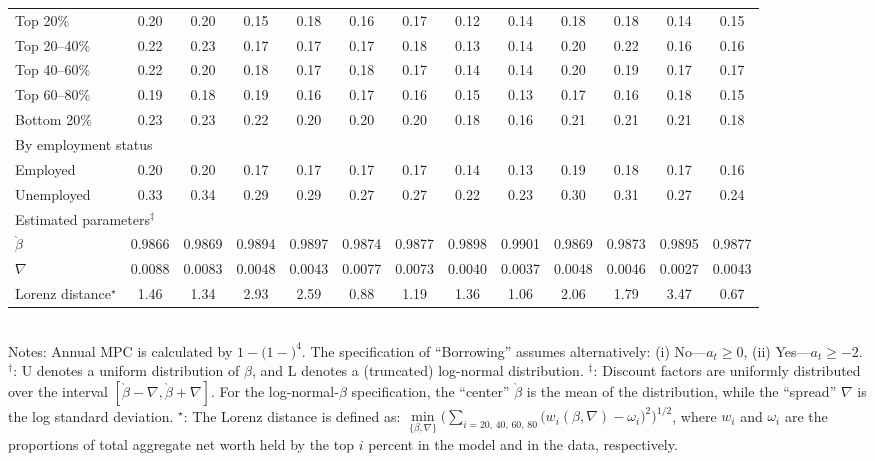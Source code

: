 \begin{sidewaystable}
\begin{tabular}{l c c c c c c c c c c c c}
Top 20\%    & 0.20 & 0.20 & 0.15 & 0.18 & 0.16 & 0.17 & 0.12 & 0.14 & 0.18 & 0.18 & 0.14 & 0.15\\
Top 20--40\% & 0.22 & 0.23 & 0.17 & 0.17 & 0.17 & 0.18 & 0.13 & 0.14 & 0.20 & 0.22 & 0.16 & 0.16\\
Top 40--60\% & 0.22 & 0.20 & 0.18 & 0.17 & 0.18 & 0.17 & 0.14 & 0.14 & 0.20 & 0.19 & 0.17 & 0.17\\
Top 60--80\% & 0.19 & 0.18 & 0.19 & 0.16 & 0.17 & 0.16 & 0.15 & 0.13 & 0.17 & 0.16 & 0.18 & 0.15\\
Bottom 20\% & 0.23 & 0.23 & 0.22 & 0.20 & 0.20 & 0.20 & 0.18 & 0.16 & 0.21 & 0.21 & 0.21 & 0.18\\
\multicolumn{13}{l}{By employment status }\\
Employed    & 0.20 & 0.20 & 0.17 & 0.17 & 0.17 & 0.17 & 0.14 & 0.13 & 0.19 & 0.18 & 0.17 & 0.16\\
Unemployed  & 0.33 & 0.34 & 0.29 & 0.29 & 0.27 & 0.27 & 0.22 & 0.23 & 0.30 & 0.31 & 0.27 & 0.24\\
\midrule
\multicolumn{13}{l}{Estimated parameters${}^\ddagger$ }\\
$\grave{\beta}$ & 0.9866 & 0.9869 & 0.9894 & 0.9897 & 0.9874 & 0.9877 & 0.9898 & 0.9901 & 0.9869 & 0.9873 & 0.9895 & 0.9877\\
$\nabla$ & 0.0088 & 0.0083 & 0.0048 & 0.0043 & 0.0077 & 0.0073 & 0.0040 & 0.0037 & 0.0048 & 0.0046 & 0.0027 & 0.0043\\
\midrule
Lorenz distance${}^\star$ & 1.46 & 1.34 & 2.93 & 2.59 & 0.88 & 1.19 & 1.36 & 1.06 & 2.06 & 1.79 & 3.47 & 0.67\\
\bottomrule
\end{tabular}\\
\footnotesize Notes: Annual MPC is calculated by $1-(1-$$)^{4}$.  The specification of ``Borrowing'' assumes alternatively: (i) No---$a_t\ge0$, (ii) Yes---$a_t\ge-2$. ${}^\dagger$: U denotes a uniform distribution of $\beta$, and L denotes a (truncated) log-normal distribution. ${}^\ddagger$: Discount factors are uniformly distributed over the interval $[\grave{\beta}-\nabla,\grave{\beta}+\nabla]$. For the log-normal-$\beta$ specification,  the ``center'' $\grave{\beta}$ is the mean of the distribution, while the ``spread'' $\nabla$ is the log standard deviation.
${}^\star$: The Lorenz distance is defined as: $\underset{\{{\beta}, \nabla\}}{\min }\Big(\sum_{\text{$i=20$, $40$, $60$, $80$}}
\big(w_{i}({\beta}, \nabla)-\omega _{i}\big)^{2}\Big)^{1/2}$, where $w_{i}$ and $\omega _{i}$ are the proportions of total aggregate net worth held by the top $i$ percent in the model and in the data, respectively.
\end{sidewaystable}


